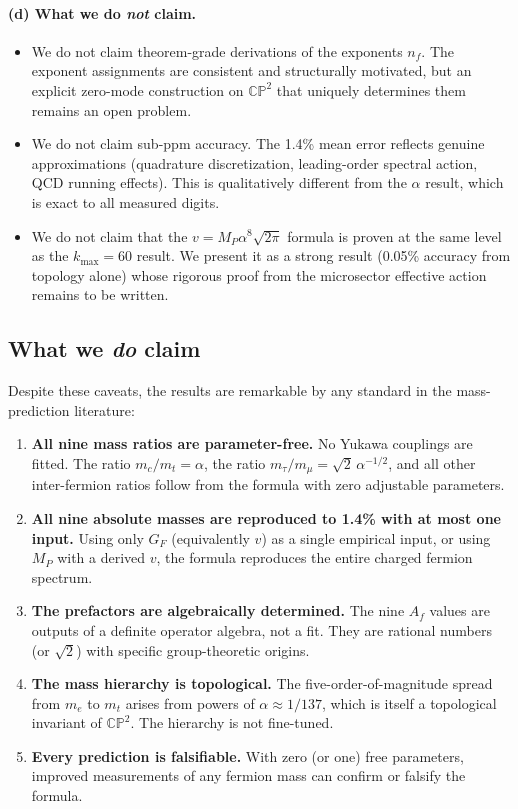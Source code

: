 \documentclass[11pt,a4paper]{article}
\newcommand{\CP}{\mathbb{CP}}
\theoremstyle{definition}
\theoremstyle{remark}
\begin{document}
\paragraph{(d) What we do \emph{not} claim.}
\begin{itemize}
\item We do not claim theorem-grade derivations of the exponents
  $n_f$. The exponent assignments are consistent and structurally
  motivated, but an explicit zero-mode construction on $\CP^2$ that
  uniquely determines them remains an open problem.
\item We do not claim sub-ppm accuracy. The 1.4\% mean error
  reflects genuine approximations (quadrature discretization, leading-order
  spectral action, QCD running effects). This is qualitatively different
  from the $\alpha$ result, which is exact to all measured digits.
\item We do not claim that the $v = M_P\alpha^8\sqrt{2\pi}$ formula
  is proven at the same level as the $k_{\max} = 60$ result.
  We present it as a strong result (0.05\% accuracy from topology alone)
  whose rigorous proof from the microsector effective action remains
  to be written.
\end{itemize}

\subsection{What we \emph{do} claim}

Despite these caveats, the results are remarkable by any standard
in the mass-prediction literature:

\begin{enumerate}
\item \textbf{All nine mass ratios are parameter-free.}
  No Yukawa couplings are fitted. The ratio $m_c/m_t = \alpha$,
  the ratio $m_\tau/m_\mu = \sqrt{2}\,\alpha^{-1/2}$, and all
  other inter-fermion ratios follow from the formula with zero
  adjustable parameters.

\item \textbf{All nine absolute masses are reproduced to 1.4\%
  with at most one input.}
  Using only $G_F$ (equivalently $v$) as a single empirical input,
  or using $M_P$ with a derived $v$, the formula reproduces the
  entire charged fermion spectrum.

\item \textbf{The prefactors are algebraically determined.}
  The nine $A_f$ values are outputs of a definite operator algebra,
  not a fit. They are rational numbers (or $\sqrt{2}$) with
  specific group-theoretic origins.

\item \textbf{The mass hierarchy is topological.}
  The five-order-of-magnitude spread from $m_e$ to $m_t$ arises
  from powers of $\alpha \approx 1/137$, which is itself a
  topological invariant of $\CP^2$. The hierarchy is not fine-tuned.

\item \textbf{Every prediction is falsifiable.}
  With zero (or one) free parameters, improved measurements of
  any fermion mass can confirm or falsify the formula.
\end{enumerate}
\end{document}
